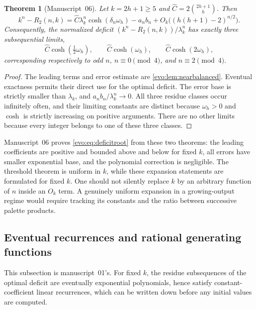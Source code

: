 \documentclass[11pt,a4paper]{article}
\numberwithin{equation}{section}
\newtheorem{theorem}{Theorem}[section]
\theoremstyle{definition}
\theoremstyle{remark}
\begin{document}
\begin{theorem}[Manuscript~06]\label{evo:thm:oddasymptotic}
Let $k=2h+1\ge5$ and $\hat C=2\binom{2h+1}{h}$. Then
\begin{equation}\label{evo:eq:oddexpansion}
 k^n-R_2(n,k)
 =\hat C\lambda_k^n\cosh(\delta_n\omega_h)
   -a_nb_n+O_k\bigl((h(h+1)-2)^{n/2}\bigr).
\end{equation}
Consequently, the normalized deficit $(k^n-R_2(n,k))/\lambda_k^n$ has exactly
three subsequential limits,
\begin{equation}\label{evo:eq:oddlimits}
 \hat C\cosh\!\left(\tfrac12\omega_h\right),\qquad
 \hat C\cosh(\omega_h),\qquad
 \hat C\cosh(2\omega_h),
\end{equation}
corresponding respectively to odd $n$, $n\equiv0\pmod4$, and
$n\equiv2\pmod4$.
\end{theorem}
\begin{proof}
The leading terms and error estimate are \cref{evo:lem:nearbalanced}.
Eventual exactness permits their direct use for the optimal deficit. The error
base is strictly smaller than $\lambda_k$, and $a_nb_n/\lambda_k^n\to0$. All
three residue classes occur infinitely often, and their limiting constants
are distinct because $\omega_h>0$ and $\cosh$ is strictly increasing on
positive arguments. There are no other limits because every integer belongs
to one of these three classes.
\end{proof}

Manuscript~06 proves \eqref{evo:eq:deficitroot} from these two theorems: the
leading coefficients are positive and bounded above and below for fixed $k$,
all errors have smaller exponential base, and the polynomial correction is
negligible. The threshold theorem is uniform in $k$, while these expansion
statements are formulated for fixed $k$. One should not silently replace $k$
by an arbitrary function of $n$ inside an $O_k$ term. A genuinely uniform
expansion in a growing-output regime would require tracking its constants and
the ratio between successive palette products.

\subsection{Eventual recurrences and rational generating functions}

This subsection is manuscript~01's. For fixed $k$, the residue subsequences
of the optimal deficit are eventually exponential polynomials, hence satisfy
constant-coefficient linear recurrences, which can be written down before any
initial values are computed.
\end{document}

